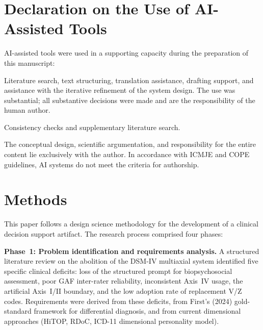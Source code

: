 \documentclass[11pt,a4paper]{article}
\begin{document}
\newpage
\tableofcontents
\newpage

\section*{Declaration on the Use of AI-Assisted Tools}

AI-assisted tools were used in a supporting capacity during the preparation of this manuscript:

\begin{description}[style=nextline, leftmargin=2cm]
\item[\textbf{Claude Opus 4.6} (Anthropic)] Literature search, text structuring, translation assistance, drafting support, and assistance with the iterative refinement of the system design. The use was substantial; all substantive decisions were made and are the responsibility of the human author.
\item[\textbf{Gemini} (Google DeepMind) \& \textbf{Copilot} (Microsoft)] Consistency checks and supplementary literature search.
\end{description}

\noindent The conceptual design, scientific argumentation, and responsibility for the entire content lie exclusively with the author. In accordance with ICMJE and COPE guidelines, AI systems do not meet the criteria for authorship.

\newpage

\section{Methods}

This paper follows a design science methodology for the development of a clinical decision support artifact. The research process comprised four phases:

\textbf{Phase~1: Problem identification and requirements analysis.} A structured literature review on the abolition of the DSM-IV multiaxial system identified five specific clinical deficits: loss of the structured prompt for biopsychosocial assessment, poor GAF inter-rater reliability, inconsistent Axis~IV usage, the artificial Axis~I/II boundary, and the low adoption rate of replacement V/Z codes. Requirements were derived from these deficits, from First's (2024) gold-standard framework for differential diagnosis, and from current dimensional approaches (HiTOP, RDoC, ICD-11 dimensional personality model).
\end{document}
